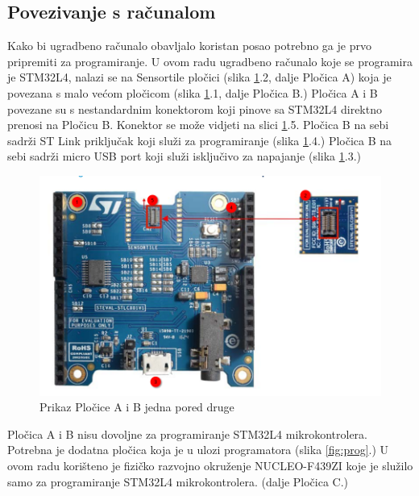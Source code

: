 \documentclass[times, utf8, diplomski]{diplomski}
\begin{document}
\subsection{Povezivanje s računalom}
Kako bi ugradbeno računalo obavljalo koristan posao potrebno ga je prvo pripremiti za programiranje.
U ovom radu ugradbeno računalo koje se programira je STM32L4, nalazi se na Sensortile pločici (slika \ref{fig:plocab}.2, dalje Pločica A) koja je povezana s malo većom pločicom (slika \ref{fig:plocab}.1, dalje Pločica B.)
Pločica A i B povezane su s nestandardnim konektorom koji pinove sa STM32L4 direktno prenosi na Pločicu B.
Konektor se može vidjeti na slici \ref{fig:plocab}.5.
Pločica B na sebi sadrži ST Link \cite{stlink} priključak koji služi za programiranje (slika \ref{fig:plocab}.4.)
Pločica B na sebi sadrži micro USB port koji služi isključivo za napajanje (slika \ref{fig:plocab}.3.)

\begin{figure}[H]
\includegraphics[scale=0.5]{PlocicaAiB.png}
\centering
\caption{Prikaz Pločice A i B jedna pored druge \cite{gettingstartedsensor}}
\label{fig:plocab}
\end{figure}

Pločica A i B nisu dovoljne za programiranje STM32L4 mikrokontrolera. Potrebna je dodatna pločica koja je u ulozi programatora (slika \ref{fig:prog}.) U ovom radu korišteno je fizičko razvojno okruženje NUCLEO-F439ZI koje je služilo samo za programiranje STM32L4 mikrokontrolera.
(dalje Pločica C.)
\end{document}
